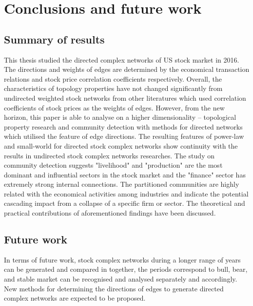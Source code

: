 \chapter[Conclusions]{Conclusions and future work}
\label{cpt:conclude}
\section{Summary of results}
This thesis studied the directed complex networks of US stock market in 2016. The directions and weights of edges are determined by the economical transaction relations and stock price correlation coefficients respectively. Overall, the characteristics of topology properties have not changed significantly from undirected weighted stock networks from other literatures which used correlation coefficients of stock prices as the weights of edges. However, from the new horizon, this paper is able to analyse on a higher dimensionality -- topological property research and community detection with methods for directed networks which utilised the feature of edge directions. The resulting features of power-law and small-world for directed stock complex networks show continuity with the results in undirected stock complex networks researches. The study on community detection suggests "livelihood" and "production" are the most dominant and influential sectors in the stock market and the "finance" sector has extremely strong internal connections. The partitioned communities are highly related with the economical activities among industries and indicate the potential cascading impact from a collapse of a specific firm or sector. The theoretical and practical contributions of aforementioned findings have been discussed.


\section{Future work}
In terms of future work, stock complex networks during a longer range of years can be generated and compared in together, the periods correspond to bull, bear, and stable market can be recognised and analysed separately and accordingly. New methods for determining the directions of edges to generate directed complex networks are expected to be proposed.
